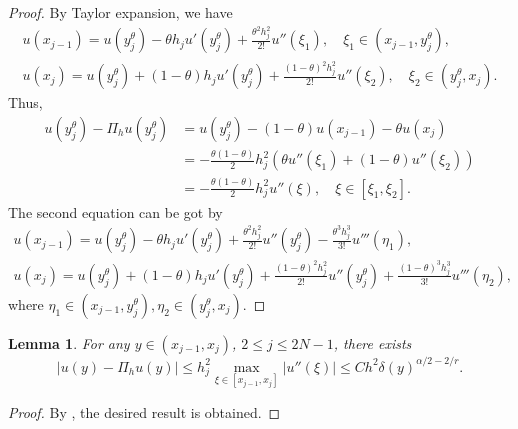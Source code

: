 \documentclass{amsart}
\newtheorem{lemma}[theorem]{Lemma}
\theoremstyle{definition}
\theoremstyle{remark}
\numberwithin{equation}{section}
\begin{document}
\begin{proof}
  By Taylor expansion, we have
  \begin{gather*}
    u(x_{j-1}) = u(y_j^\theta) - \theta h_{j} u'(y_j^\theta) + \frac{\theta^2 h_{j}^2}{2!} u''(\xi_1), \quad \xi_1 \in (x_{j-1}, y_j^\theta) ,\\
    u(x_{j}) = u(y_j^\theta) + (1-\theta) h_{j} u'(y_j^\theta) + \frac{(1-\theta)^2 h_{j}^2}{2!} u''(\xi_2) , \quad \xi_2 \in (y_j^\theta, x_j) .
  \end{gather*}
  Thus,
  \begin{equation*}
    \begin{aligned}
      u(y_j^\theta) - \Pi_hu(y_j^\theta) 
      & = u(y_j^\theta) - (1-\theta) u(x_{j-1}) - \theta u(x_{j})      \\
      & = -\frac{\theta (1-\theta)}{2} h_j^2 ( \theta u''(\xi_1) + (1-\theta) u''(\xi_2) ) \\
      & = -\frac{\theta (1-\theta)}{2} h_j^2 u''(\xi), \quad \xi \in [\xi_1, \xi_2].
    \end{aligned}
  \end{equation*}
  The second equation can be got by
  \begin{gather*}
    u(x_{j-1}) = u(y_j^\theta) - \theta h_{j} u'(y_j^\theta) + \frac{ \theta^2h_{j}^2}{2!} u''(y_j^\theta) - \frac{\theta^3 h_{j}^3}{3!} u'''(\eta_1) , \\
    u(x_{j}) = u(y_j^\theta) + (1-\theta) h_{j} u'(y_j^\theta) + \frac{(1-\theta)^2 h_{j}^2}{2!} u''(y_j^\theta) + \frac{(1-\theta)^3 h_{j}^3}{3!} u'''(\eta_2) ,
  \end{gather*}
  where \(\eta_1 \in (x_{j-1}, y_j^\theta), \eta_2 \in (y_j^\theta, x_j)\).
\end{proof}

\begin{lemma} \label{lmm:Dyjleh2ya/2m2/r}
  For any $y\in (x_{j-1}, x_{j})$, \(2\le j \le 2N-1\), there exists 
  \begin{equation*}
    |u(y)-\Pi_hu(y)| \le h_j^2 \max_{\xi\in [x_{j-1}, x_j]}|u''(\xi)| \le C h^2 \delta(y)^{\alpha/2-2/r}.
  \end{equation*}
\end{lemma}
\begin{proof}
  By , the desired result is obtained.
\end{proof}
\end{document}
